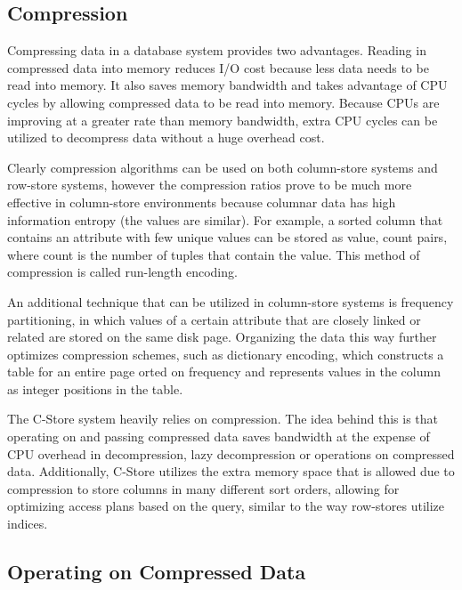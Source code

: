 


\subsection*{Compression}



Compressing data in a database system provides two advantages. Reading in compressed data into memory reduces I/O cost because less data needs to be read into memory. It also saves memory bandwidth and takes advantage of CPU cycles by allowing compressed data to be read into memory. Because CPUs are improving at a greater rate than memory bandwidth, extra CPU cycles can be utilized to decompress data without a huge overhead cost\cite{now}.


Clearly compression algorithms can be used on both column-store systems and row-store systems, however the compression ratios prove to be much more effective in column-store environments because columnar data has high information entropy (the values are similar)\cite{colvsrow}. For example, a sorted column that contains an attribute with few unique values can be stored as {value, count} pairs, where count is the number of tuples that contain the value. This method of compression is called run-length encoding\cite{now}. 


An additional technique that can be utilized in column-store systems is frequency partitioning, in which values of a certain attribute that are closely linked or related are stored on the same disk page. Organizing the data this way further optimizes compression schemes, such as dictionary encoding, which constructs a table for an entire page orted on frequency and represents values in the column as integer positions in the table\cite{now}. 


The C-Store system heavily relies on compression. The idea behind this is that operating on and passing compressed data saves bandwidth at the expense of CPU overhead in decompression, lazy decompression or operations on compressed data\cite{compression}. Additionally, C-Store utilizes the extra memory space that is allowed due to compression to store columns in many different sort orders, allowing for optimizing access plans based on the query, similar to the way row-stores utilize indices.


\subsection*{Operating on Compressed Data}


